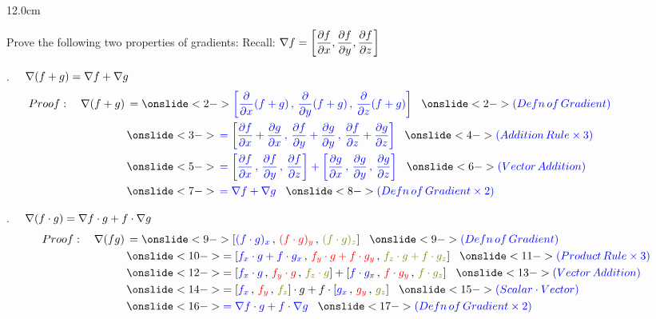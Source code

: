\begin{frame}
\begin{columns}\begin{column}{12.0cm}

\vspace{0.1cm}

\scriptsize

Prove the following two properties of gradients: \qquad Recall:  $\displaystyle{\nabla f = \left[{\dfrac{\partial f}{\partial x}},{\dfrac{\partial f}{\partial y}},{\dfrac{\partial f}{\partial z}}\right]}$

. $\displaystyle{\quad \nabla(f+g) = {\nabla f}+ {\nabla g}}$
\begin{align*}
Proof: \quad \nabla(f+g)
&\,=
\ON<2->{\B{ \left[\PPX(f+g)\,,\,\PPY(f+g)\,,\,\PPZ(f+g)\right] }} \hspace{0.3cm} 
\ON<2->{\B{(Defn \, of \, Gradient)}} \hspace{1.9cm}\\
&\,
\ON<3->{\B{\, = \left[\PFPX+\PGPX\,,\,\PFPY+\PGPY\,,\,\PFPZ+\PGPZ\right]}} \hspace{0.3cm} 
\ON<4->{\B{(Addition \, Rule \times3)}} \\
&\,
\ON<5->{\B{\, = \left[\PFPX\,,\,\PFPY\,,\,\PFPZ\right] + \left[\PGPX\,,\,\PGPY\,,\,\PGPZ\right]}} \hspace{0.3cm} 
\ON<6->{\B{(Vector \, Addition)}}\\
&\,
\ON<7->{\B{\, = \GF + \GG}} \hspace{0.3cm} 
\ON<8->{\B{(Defn \, of \, Gradient \times 2)}}
\end{align*}

\vspace{0.4cm}

. $\displaystyle{\quad \nabla(f \cdot g) = {\nabla f}\cdot g + f \cdot {\nabla g}}$
\begin{align*}
Proof: \quad \nabla(fg)
&\,=
\ON<9->{\left[\B{(f \cdot g)_x}\,,\,\R{(f \cdot g)_y}\,,\,\G{(f \cdot g)_z}\right] }\hspace{0.3cm} 
\ON<9->{\B{(Defn \, of \, Gradient)}} \hspace{3.1cm}\\
&\,
\ON<10->{= \left[\B{f_x \cdot g + f  \cdot g_x}\,,\,\R{f_y \cdot g + f \cdot g_y}\,,\,\G{f_z \cdot g + f \cdot g_z}\right]}\hspace{0.3cm} 
\ON<11->{\B{(Product \, Rule \times3)}}\\
&\,
\ON<12->{= \left[\B{f_x \cdot g}\,,\,\R{f_y\cdot g}\,,\,\G{f_z\cdot g}\right] + \left[\B{f \cdot g_x}\,,\,\R{f \cdot g_y}\,,\,\G{f \cdot g_z}\right]} \hspace{0.3cm} 
\ON<13->{\B{(Vector \, Addition)}}\\
&\,
\ON<14->{= \left[\B{f_x} \,,\,\R{f_y}\,,\,\G{f_z}\right] \cdot g + f \cdot \left[\B{g_x}\,,\,\R{g_y}\,,\,\G{g_z}\right]} \hspace{0.3cm} 
\ON<15->{\B{(Scalar \cdot Vector)}}\\
&\,
\ON<16->{\B{= \GF \cdot g + f \cdot \GG}} \hspace{0.3cm} 
\ON<17->{\B{(Defn \, of \, Gradient \times 2)}}
\\
\end{align*}


\end{column}
\end{columns}
\end{frame}
